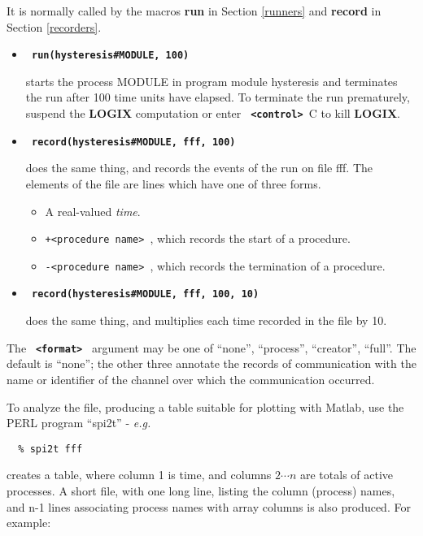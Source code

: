 \documentclass[twoside,10pt]{report}
\begin{document}
\noindent
It is normally called by the macros {\bf run} in Section
\ref{runners} and {\bf record} in Section \ref{recorders}.

\begin{itemize}
\item
  {\bf \verb+ run(hysteresis#MODULE, 100) +}

\noindent
starts the process  MODULE  in program module  hysteresis  and
terminates the run after 100 time units have elapsed.  To 
terminate the run prematurely, suspend the {\bf LOGIX} computation
or enter  {\bf \verb+ <control> +}C  to kill {\bf LOGIX}.

\item
  {\bf \verb+ record(hysteresis#MODULE, fff, 100) +}

\noindent
does the same thing, and records the events of the run on file fff.
The elements of the file are lines which have one of three forms.
\begin{itemize}
\item
A real-valued {\em time}.
\item
\verb:+<procedure name> :, which records the start of a procedure.
\item
\verb:-<procedure name> :, which records the termination of a procedure.
\end{itemize}

\item
  {\bf \verb+ record(hysteresis#MODULE, fff, 100, 10) +}

\noindent
does the same thing, and multiplies each time recorded in the file
by 10.
\end{itemize}

\noindent
The {\bf \verb+ <format> +} argument may be one of ``none'', ``process'',
``creator'', ``full''.  The default is ``none''; the other three
annotate the records of communication with the name or identifier
of the channel over which the communication occurred.

\noindent
To analyze the file, producing a table suitable for plotting with
Matlab, use the PERL program ``spi2t'' - {\em e.g.}

\begin{verbatim}
  % spi2t fff
\end{verbatim}

creates a table, where column 1 is time, and columns $2 \cdots n$ are totals
of active processes.  A short file, with one long line, listing the
column (process) names, and n-1 lines associating process names with
array columns is also produced.  For example:
\end{document}
